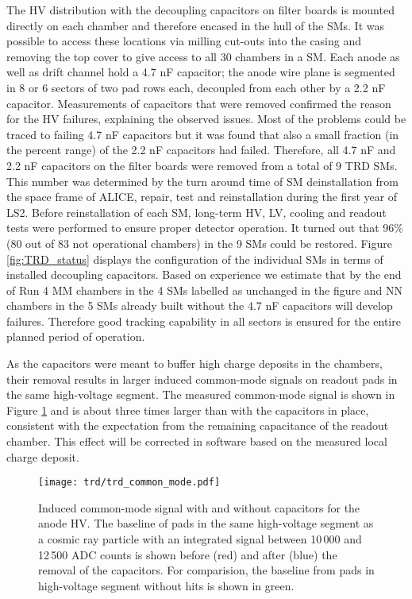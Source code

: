 The HV distribution with the decoupling capacitors on filter boards is mounted directly on each chamber and therefore encased in the hull of the SMs. It was possible to access these locations via milling cut-outs into the casing and removing the top cover to give access to all 30 chambers in a SM. 
Each anode as well as drift channel hold a 4.7 nF capacitor; the anode wire plane is segmented in 8 or 6 sectors of two pad rows each, decoupled from each other by a 2.2 nF capacitor. Measurements of capacitors that were removed confirmed the reason for the HV failures, explaining the observed issues. Most of the problems could be traced to failing 4.7 nF capacitors but it was found that also a small fraction (in the percent range) of the 2.2 nF capacitors had failed. Therefore, all 4.7 nF and 2.2 nF capacitors on the filter boards were removed from a total of 9 TRD SMs. This number was determined by the turn around time of SM deinstallation from the space frame of ALICE, repair, test and reinstallation during the first year of LS2. Before reinstallation of each SM, long-term HV, LV, cooling and readout tests were performed to ensure proper detector operation.
It turned out that 96\% (80 out of 83 not operational chambers) in the 9 SMs could be restored. 
Figure \ref{fig:TRD_status} displays the configuration of the individual SMs in terms of installed decoupling capacitors. Based on experience we estimate that by the end of Run 4 MM chambers in the 4 SMs labelled as unchanged in the figure and NN chambers in the 5 SMs already built without the 4.7 nF capacitors will develop failures. Therefore good tracking capability in all sectors is ensured for the entire planned period of operation. 

As the capacitors were meant to buffer high charge deposits in the chambers, their removal results in larger induced common-mode signals on readout pads in the same high-voltage segment. The measured common-mode signal is shown in Figure \ref{fig:common_mode_ph} and is about three times larger than with the capacitors in place, consistent with the expectation from the remaining capacitance of the readout chamber.
This effect will be corrected in software based on the measured local charge deposit.

\begin{figure}
    \centering
    \texttt{[image: trd/trd\_common\_mode.pdf]}
    \caption{Induced common-mode signal with and without capacitors for the anode HV. The baseline of pads in the same high-voltage segment as a cosmic ray particle with an integrated signal between 10\,000 and 12\,500 ADC counts is shown before (red) and after (blue) the removal of the capacitors. For comparision, the baseline from pads in high-voltage segment without hits is shown in green.}
    \label{fig:common_mode_ph}
\end{figure}
 
